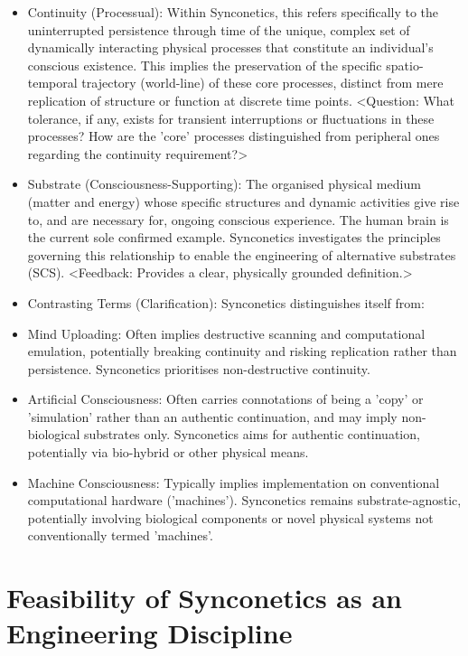 \documentclass[10pt]{article}
\begin{document}
\begin{sloppypar}
\begin{itemize}
    \item Continuity (Processual): Within Synconetics, this refers specifically to the uninterrupted persistence through time of the unique, complex set of dynamically interacting physical processes that constitute an individual's conscious existence. This implies the preservation of the specific spatio-temporal trajectory (world-line) of these core processes, distinct from mere replication of structure or function at discrete time points. <Question: What tolerance, if any, exists for transient interruptions or fluctuations in these processes? How are the 'core' processes distinguished from peripheral ones regarding the continuity requirement?>
    \item Substrate (Consciousness-Supporting): The organised physical medium (matter and energy) whose specific structures and dynamic activities give rise to, and are necessary for, ongoing conscious experience. The human brain is the current sole confirmed example. Synconetics investigates the principles governing this relationship to enable the engineering of alternative substrates (SCS). <Feedback: Provides a clear, physically grounded definition.>
    \item Contrasting Terms (Clarification): Synconetics distinguishes itself from:
    \item Mind Uploading: Often implies destructive scanning and computational emulation, potentially breaking continuity and risking replication rather than persistence. Synconetics prioritises non-destructive continuity.
    \item Artificial Consciousness: Often carries connotations of being a 'copy' or 'simulation' rather than an authentic continuation, and may imply non-biological substrates only. Synconetics aims for authentic continuation, potentially via bio-hybrid or other physical means.
    \item Machine Consciousness: Typically implies implementation on conventional computational hardware ('machines'). Synconetics remains substrate-agnostic, potentially involving biological components or novel physical systems not conventionally termed 'machines'.
  \end{itemize}

  \section{Feasibility of Synconetics as an Engineering Discipline}
  \label{sec:feasibility}


\end{sloppypar}
\end{document}
